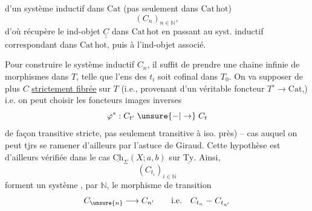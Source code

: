 
d'un système inductif dans $\mathrm{Cat}$ (pas seulement dans $\mathrm{Cat\,hot}$)
\[
(C_n)_{n\in\mathbb N},
\]
d'où  récupère le ind-objet $\underline{\underline C}$ dans $\mathrm{Cat\,hot}$ en passant au syst. inductif correspondant dans $\mathrm{Cat\,hot}$, puis à l'ind-objet associé.

Pour construire le système inductif $C_n$, il suffit de prendre une chaine infinie
de morphismes dans $T$, telle que l'ens des $t_i$ soit cofinal  dans $T_0$.  On va supposer de plus $C$ \uline{strictement fibrée} sur  $T$ (i.e., provenant d'un véritable foncteur $T^\circ\longrightarrow\mathrm{Cat}$,) i.e. on peut choisir les foncteurs images inverses \deleted{$\unsure{\varphi}$}
\[
\varphi^*:C_{t'}\mathrel{\unsure{-|\to}}C_t
\]
de façon transitive stricte, pas seulement transitive à iso. près) -- cas auquel on peut tjrs se ramener d'ailleurs par l'astuce de Giraud. Cette hypothèse est d'ailleurs vérifiée dans le cas $\underline{\mathrm{Ch}}_\Sigma(X;a,b)$ sur $\underline{\mathrm{Ty}}$. Ainsi, 
\[
(C_{t_i})_{i\in\mathbb N}
\]
forment un système    ,  par $\mathbb N$, le morphisme de transition
\[
C_{\unsure{n}}\longrightarrow C_{n'}\qquad\text{i.e.}\quad C_{t_n}\mathrel{-}C_{t_{n'}}
\]

